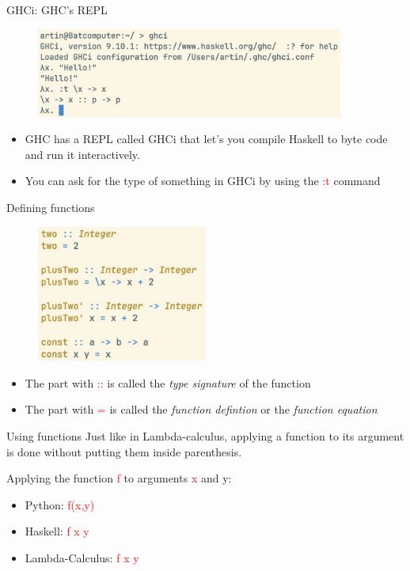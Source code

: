 \documentclass[pdf]{beamer}
\newcommand{\code}[1]{\textcolor{Red}{\textsf{#1}}}
\begin{document}
\begin{frame}{GHCi: GHC's REPL}
  \begin{figure}[H]
    \centering
    \includegraphics[width=0.90\textwidth]{ghci}
  \end{figure}
  \begin{itemize}
  \item GHC has a REPL called GHCi that let's you compile Haskell to byte code and run it interactively.
  \item You can ask for the type of something in GHCi by using the \code{:t} command
  \end{itemize}
\end{frame}

\begin{frame}{Defining functions}
  \begin{figure}[H]
    \centering
    \includegraphics[width=0.50\textwidth]{decls}
  \end{figure}
  \begin{itemize}
    \item The part with \code{::} is called the \emph{type signature} of the function
    \item The part with \code{=} is called the \emph{function defintion} or the \emph{function equation}
  \end{itemize}
\end{frame}

\begin{frame}{Using functions}
  Just like in Lambda-calculus, applying a function to its argument is done without putting them inside parenthesis.

  Applying the function \code{f} to arguments \code{x} and {y}:
  \begin{itemize}
  \item Python: \code{f(x,y)}
  \item Haskell: \code{f x y}
  \item Lambda-Calculus: \code{f x y}
  \end{itemize}
\end{frame}
\end{document}
